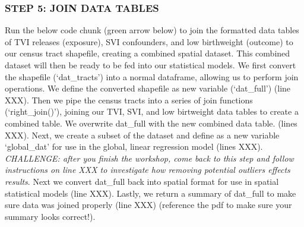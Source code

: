 \documentclass[
  12pt,
]{article}
\begin{document}
\hypertarget{step-5-join-data-tables}{%
\subsubsection{STEP 5: JOIN DATA TABLES}\label{step-5-join-data-tables}}

Run the below code chunk (green arrow below) to join the formatted data
tables of TVI releases (exposure), SVI confounders, and low birthweight
(outcome) to our census tract shapefile, creating a combined spatial
dataset. This combined dataset will then be ready to be fed into our
statistical models. We first convert the shapefile (`dat\_tracts') into
a normal dataframe, allowing us to perform join operations. We define
the converted shapefile as new variable (`dat\_full') (line XXX). Then
we pipe the census tracts into a series of join functions
(`right\_join()'), joining our TVI, SVI, and low birtweight data tables
to create a combined table. We overwrite dat\_full with the new combined
data table. (lines XXX). Next, we create a subset of the dataset and
define as a new variable `global\_dat' for use in the global, linear
regression model (lines XXX). \emph{CHALLENGE: after you finish the
workshop, come back to this step and follow instructions on line XXX to
investigate how removing potential outliers effects results}. Next we
convert dat\_full back into spatial format for use in spatial
statistical models (line XXX). Lastly, we return a summary of dat\_full
to make sure data was joined properly (line XXX) (reference the pdf to
make sure your summary looks correct!).
\end{document}
